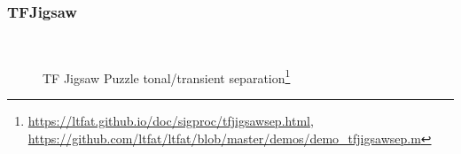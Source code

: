 \documentclass[usenames,dvipsnames]{beamer}
\begin{document}
\begin{frame}
	\frametitle{TFJigsaw}
	\begin{figure}[ht]
		\vspace{-1em}
		\\
		\vspace{-1em}
		\caption{TF Jigsaw Puzzle tonal/transient separation\footnote{\url{https://ltfat.github.io/doc/sigproc/tfjigsawsep.html}, \url{https://github.com/ltfat/ltfat/blob/master/demos/demo_tfjigsawsep.m}}}
	\end{figure}
\end{frame}
\end{document}
